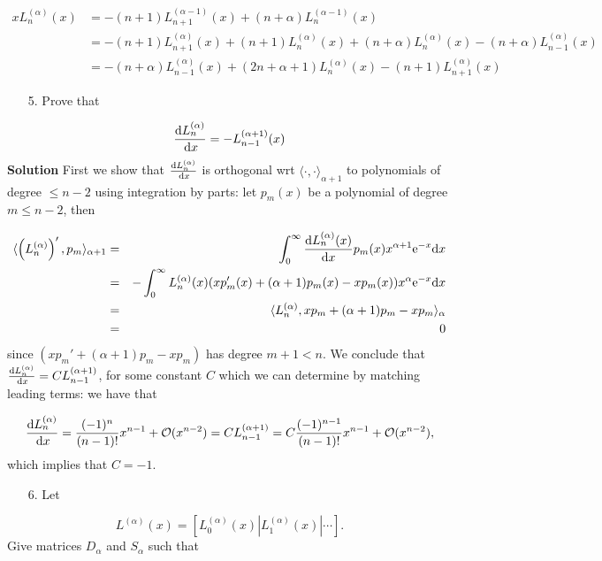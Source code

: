\documentclass[12pt,a4paper]{article}
\begin{document}
\begin{align*}
x L_n^{(\alpha)}(x) &= -(n+1)L_{n+1}^{(\alpha-1)}(x) +(n+\alpha)L_n^{(\alpha-1)}(x) \\
  &= -(n+1)L_{n+1}^{(\alpha)}(x) + (n+1)L_{n}^{(\alpha)}(x) +(n+\alpha)L_{n}^{(\alpha)}(x) - (n+\alpha)L_{n-1}^{(\alpha)}(x) \\
  &= - (n+\alpha)L_{n-1}^{(\alpha)}(x) + (2n+\alpha+1) L_n^{(\alpha)}(x) -(n+1)L_{n+1}^{(\alpha)}(x)
\end{align*}
\begin{itemize}
\item[5. ] Prove that 

\end{itemize}
\[
{{\rm d} L_n^{(\alpha)} \over \,{\rm d}x}  = -L_{n-1}^{(\alpha+1)}(x)
\]
\textbf{Solution} First we show that ${{\rm d} L_n^{(\alpha)} \over \,{\rm d}x}$ is orthogonal wrt $\langle \cdot, \cdot \rangle_{\alpha + 1}$ to polynomials of degree $\leq n-2$ using integration by parts: let $p_m(x)$ be a polynomial of degree $m \leq n-2$, then


\begin{eqnarray*}
\langle \left(L_n^{(\alpha)}\right)', p_m  \rangle_{\alpha+1}  &=&\int_0^\infty {{\rm d} L_n^{(\alpha)}(x) \over {\rm d} x} p_m(x) x^{\alpha+1} {\rm e}^{-x} {\rm d} x  \\
&=& -\int_0^\infty L_n^{(\alpha)}(x) (x p_m'(x) + (\alpha+1) p_m(x) - x p_m(x)) x^{\alpha} {\rm e}^{-x} {\rm d} x  \\
&=& \langle L_n^{(\alpha)}, x p_m + (\alpha+1) p_m - x p_m \rangle_{\alpha} \\
&=& 0 
\end{eqnarray*}
since $(x p_m' + (\alpha+1) p_m - x p_m) $ has degree $m+1 < n$.  We conclude that ${{\rm d} L_n^{(\alpha)} \over \,{\rm d}x} = C L^{(\alpha+1)}_{n-1}$, for some constant $C$ which we can determine by matching leading terms: we have that

\[
{{\rm d} L_n^{(\alpha)} \over \,{\rm d}x} = \frac{(-1)^n}{(n-1)!}x^{n-1} + \mathcal{O}(x^{n-2}) = CL^{(\alpha+1)}_{n-1} = C \frac{(-1)^{n-1}}{(n-1)!}x^{n-1} + \mathcal{O}(x^{n-2}),
\]
which implies that $C = -1$.

\begin{itemize}
\item[6. ] Let 

\end{itemize}
\[
L^{(\alpha)}(x) = \left[L_0^{(\alpha)}(x) |  L_1^{(\alpha)}(x) | \cdots  \right].
\]
Give matrices $D_{\alpha}$ and $S_{\alpha}$ such that
\end{document}
